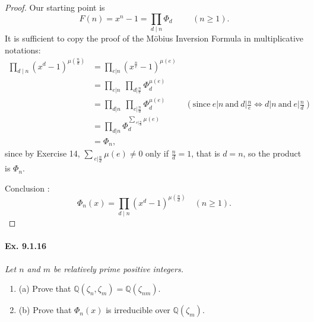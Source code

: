 \documentclass[11pt,a4paper]{article}
\newcommand{\be} {\begin{enumerate}}
\newcommand{\ee} {\end{enumerate}}
\newcommand{\Q}{\mathbb{Q}}
\begin{document}
\begin{proof}
Our starting point is $$F(n) = x^n - 1 = \prod\limits_{ d \mid n} \Phi_d \hspace{1cm} (n \geq 1).$$
It is sufficient to copy the proof of the M\"obius Inversion Formula in multiplicative notations:
\begin{align*}
   \prod_{d \mid n} (x^d - 1)^{\mu \left (\frac{n}{d} \right )} &=  \prod\limits_{e \vert n}  (x^{\frac{n}{e}} -1)^{\mu(e)}\\
           &= \prod\limits_{e \vert n} \ \prod\limits_ {d \vert \frac{n}{e}} \Phi_d^{ \mu(e) } \\
            &=\prod\limits_{d \vert n}\  \prod_{e \vert \frac{n}{d}}\Phi_d^{\mu(e)}
            			\hspace{1cm} (\mathrm{ since }\  e\vert n \  \mathrm{and}   \ d \vert \frac{n}{e}  \iff d \vert n\  \mathrm{and}  \ e \vert \frac{n}{d}) \\
           & = \prod\limits_{d \vert n}   \Phi_d^{\sum\limits_{\ e \vert \frac{n}{d}}\mu(e)} \\
           &= \Phi_n,
 \end{align*}         
           since by Exercise 14, $\sum_{\ e \vert \frac{n}{d}} \mu(e) \not = 0$ only if $\frac{n}{d}=1$, that is $d =n$, so the product is $\Phi_n$.

Conclusion :            
$$\Phi_n(x) = \prod\limits_{d \mid n} (x^d - 1)^{\mu \left (\frac{n}{d} \right )}\quad (n\geq 1).$$
\end{proof}

\paragraph{Ex. 9.1.16}

{\it Let $n$ and $m$ be relatively prime positive integers.
\be
\item[(a)] Prove that $\Q(\zeta_n,\zeta_m) = \Q(\zeta_{nm})$.
\item[(b)] Prove that $\Phi_n(x)$ is irreducible over $\Q(\zeta_m)$.
\ee
}
\end{document}
